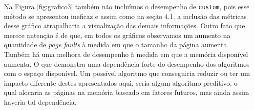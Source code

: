Na Figura \ref{fig:grafico3} também não incluímos o desempenho de \texttt{custom},
pois esse método se apresentou ineficaz e assim como na seção 4.1, a inclusão das
métricas desse gráfico atrapalharia a visualização das demais informações.
Outro fato que merece antenção é de que, em todos os gráficos observamos um aumento
na quantidade de \textit{page faults} à medida em que o tamanho da página aumenta.
Também há uma melhora de desempenho à medida em que a memória disponível aumenta.
O que demonstra uma dependência forte do desempenho dos algoritmos com o espaço
disponível.
Um possível algoritmo que conseguiria reduzir ou ter um impacto diferente destes
apresentados aqui, seria algum algoritmo preditivo, o qual alocaria as páginas
na memória baseado em fatores futuros, mas ainda assim haveria tal dependência.
